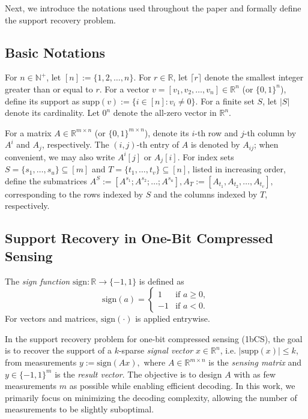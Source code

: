 \documentclass{article}
\newcommand{\supp}{\mathrm{supp}}
\newcommand{\sgn}{\mathrm{sign}}
\begin{document}
Next, we introduce the notations used throughout the paper and formally define the support recovery problem.

\subsection{Basic Notations}
For $n \in \mathbb{N}^+$, let $[n] := \{1,2,\dots,n\}$. For $r \in \mathbb{R}$, let $\lceil r \rceil$ denote the smallest integer greater than or equal to $r$. For a vector $v = [v_1, v_2, \dots, v_n] \in \mathbb{R}^n$ (or $\{0,1\}^n$), define its support as
\(
\supp(v) := \{ i \in [n] : v_i \neq 0 \}.
\)
For a finite set $S$, let $|S|$ denote its cardinality. Let $0^n$ denote the all-zero vector in $\mathbb{R}^n$.

For a matrix $A \in \mathbb{R}^{m \times n}$ (or $\{0,1\}^{m \times n}$), denote its $i$-th row and $j$-th column by $A^i$ and $A_j$, respectively. The $(i,j)$-th entry of $A$ is denoted by $A_{ij}$; when convenient, we may also write $A^i[j]$ or $A_j[i]$. For index sets $S = \{s_1, \dots, s_u\} \subseteq [m]$ and $T = \{t_1, \dots, t_v\} \subseteq [n]$, listed in increasing order, define the submatrices
\(
A^{S} := [A^{s_1}; A^{s_2}; \dots; A^{s_u}],
A_T := [A_{t_1}, A_{t_2}, \dots, A_{t_v}],
\)
corresponding to the rows indexed by $S$ and the columns indexed by $T$, respectively.

\subsection{Support Recovery in One-Bit Compressed Sensing}\label{sec:1bCS}

The \emph{sign function} $\sgn : \mathbb{R} \to \{-1,1\}$ is defined as
\[
\sgn(a) =
\begin{cases}
1 & \text{if } a \geq 0,\\
-1 & \text{if } a < 0.
\end{cases}
\]
For vectors and matrices, $\sgn(\cdot)$ is applied entrywise.

In the support recovery problem for one-bit compressed sensing (1bCS), the goal is to recover the support of a $k$-sparse \emph{signal vector} $x \in \mathbb{R}^n$, i.e. $|\supp(x)| \leq k$, from measurements
\(
y := \sgn(Ax),
\)
where $A \in \mathbb{R}^{m \times n}$ is the \emph{sensing matrix} and $y \in \{-1,1\}^m$ is the \emph{result vector}. The objective is to design $A$ with as few measurements $m$ as possible while enabling efficient decoding. In this work, we primarily focus on minimizing the decoding complexity, allowing the number of measurements to be slightly suboptimal.
\end{document}
